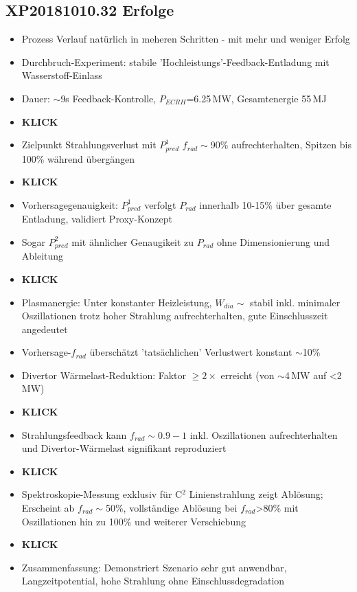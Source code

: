 \documentclass[11pt,a4paper]{article}
\begin{document}
\subsection{XP20181010.32 Erfolge}

\begin{itemize}
\item Prozess Verlauf natürlich in meheren Schritten - mit mehr und weniger Erfolg
\item Durchbruch-Experiment: stabile 'Hochleistungs'-Feedback-Entladung mit Wasserstoff-Einlass
\item Dauer: $\sim$9s Feedback-Kontrolle, $P_{ECRH}$=6.25\,MW, Gesamtenergie 55\,MJ
\item \textbf{KLICK}
\item Zielpunkt Strahlungsverlust mit $P_{pred}^{1}$ $f_{rad}\sim$90\% aufrechterhalten, Spitzen bis 100\% während übergängen
\item \textbf{KLICK}
\item Vorhersagegenauigkeit: $P_{pred}^{1}$ verfolgt $P_{rad}$ innerhalb 10-15\% über gesamte Entladung, validiert Proxy-Konzept
\item Sogar $P_{pred}^{2} $ mit ähnlicher Genaugikeit zu $P_{rad}$ ohne Dimensionierung und Ableitung
\item \textbf{KLICK}
\item Plasmanergie: Unter konstanter Heizleistung, $W_{dia}\sim$ stabil inkl. minimaler Oszillationen trotz hoher Strahlung aufrechterhalten, gute Einschlusszeit angedeutet
\item Vorhersage-$f_{rad}$ überschätzt 'tatsächlichen' Verlustwert konstant $\sim$10\%
\item Divertor Wärmelast-Reduktion: Faktor $\geq2\times$ erreicht (von $\sim$4\,MW auf <2\,MW)
\item \textbf{KLICK}
\item Strahlungsfeedback kann $f_{rad}\sim0.9-1$ inkl. Oszillationen aufrechterhalten und Divertor-Wärmelast signifikant reproduziert
\item \textbf{KLICK}
\item Spektroskopie-Messung exklusiv für C$^2$ Linienstrahlung zeigt Ablösung; Erscheint ab $f_{rad}\sim$50\%, vollständige Ablösung bei $f_{rad}$>80\% mit Oszillationen hin zu 100\% und weiterer Verschiebung
\item \textbf{KLICK}
\item Zusammenfassung: Demonstriert Szenario sehr gut anwendbar, Langzeitpotential, hohe Strahlung ohne Einschlussdegradation
\end{itemize}
\end{document}

